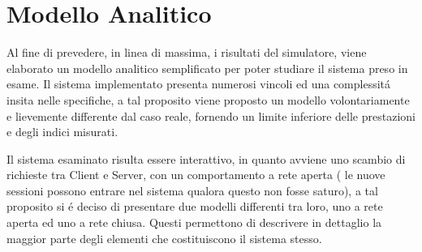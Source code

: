 \section{Modello Analitico}
Al fine di prevedere, in linea di massima, i risultati del simulatore, viene elaborato un modello  analitico semplificato per poter studiare il sistema preso in esame.
Il sistema implementato presenta numerosi vincoli ed una complessit\'a insita nelle specifiche, a tal proposito viene proposto un modello volontariamente e lievemente differente dal caso reale, fornendo un limite inferiore delle prestazioni e degli indici misurati.

Il sistema esaminato risulta essere interattivo, in quanto avviene uno scambio di richieste tra Client e Server, con un comportamento a rete aperta ( le nuove sessioni possono entrare nel sistema qualora questo non fosse saturo), a tal proposito si \'e deciso di presentare due modelli differenti tra loro, uno a rete aperta ed uno a rete chiusa. Questi permettono di descrivere in dettaglio la maggior parte degli elementi che costituiscono il sistema stesso.

